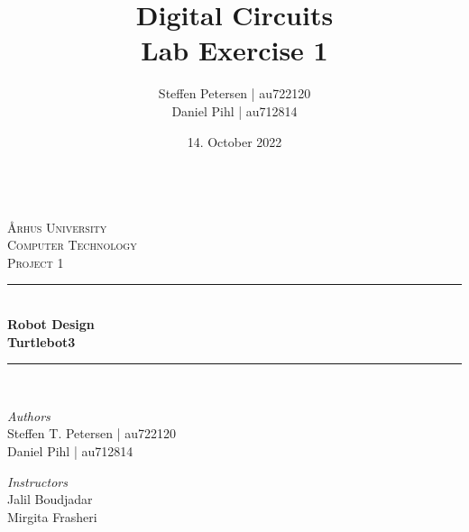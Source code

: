 \documentclass{article}
\title{\Huge Digital Circuits\\\LARGE Lab Exercise 1}
\author{Steffen Petersen | au722120 \\ Daniel Pihl | au712814}
\date{14. October 2022}
\begin{document}

\begin{titlepage} %
  \newcommand{\HRule}{\rule{\linewidth}{0.5mm}} %

    \center %
    
    \textbf{\space}\\[2cm]   
    \textsc{\LARGE Århus University}\\[1.5cm] %
    
    \textsc{\Large Computer Technology}\\[0.5cm] %
    
    \textsc{\large Project 1}\\[0.5cm] %
    
    
    \HRule\\[0cm]
    
    {\huge\bfseries Robot Design\\[0.1cm]}
    {\large\bfseries Turtlebot3\\}
    
    \HRule\\[1.5cm]
    
    
    \begin{minipage}{0.4\textwidth}
      \begin{flushleft}
        \large
        \textit{Authors}\\
        Steffen T. Petersen | au722120\\
        Daniel Pihl | au712814
      \end{flushleft}
    \end{minipage}
    \begin{minipage}{0.4\textwidth}
      \begin{flushright}
        \large\vspace{-4mm}
        \textit{Instructors}\\
        Jalil Boudjadar\\
        Mirgita Frasheri
      \end{flushright}
    \end{minipage}
    

\end{titlepage}
\end{document}
